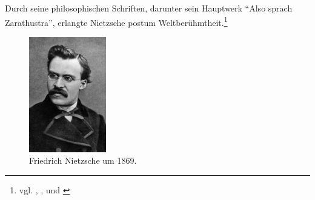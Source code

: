 Durch seine philosophischen Schriften, darunter sein Hauptwerk \enquote{Also sprach Zarathustra}, erlangte Nietzsche postum Weltberühmtheit.\footnote{vgl. \cite{Nietzsche1}, \cite{Nietzsche2}, \cite{Nietzsche3} und \cite{Nietzsche4}}

\begin{figure}[H]
\centering 
 \includegraphics[width=0.3\textwidth]{Bilder/kap3/nietzschePortrait} 
 \caption{Friedrich Nietzsche um 1869.\cite{WQ14}  \label{portraitNietzsche}}
\end{figure}





